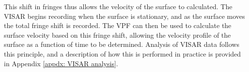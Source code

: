 This shift in fringes thus allows the velocity of the surface to calculated. The VISAR begins recording when the surface is stationary, and as the surface moves the total fringe shift is recorded. The VPF can then be used to calculate the surface velocity based on this fringe shift, allowing the velocity profile of the surface as a function of time to be determined. Analysis of VISAR data follows this principle, and a description of how this is performed in practice is provided in Appendix \ref{appdx: VISAR analysis}.






